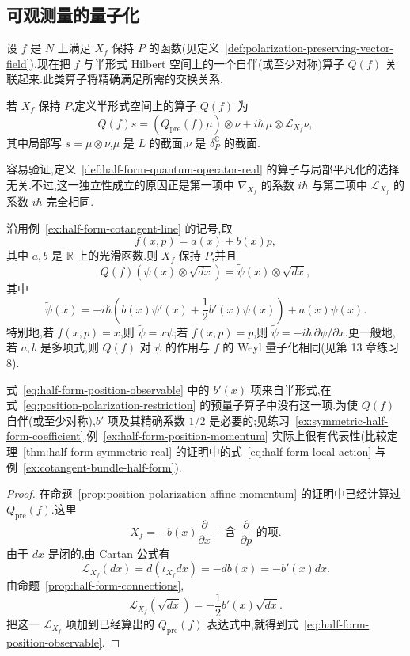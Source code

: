 \subsection{可观测量的量子化}
\label{subsec:quantization-real-observables}

设 $f$ 是 $N$ 上满足 $X_f$ 保持 $P$ 的函数(见定义~\ref{def:polarization-preserving-vector-field}).现在把 $f$ 与半形式 Hilbert 空间上的一个自伴(或至少对称)算子 $Q(f)$ 关联起来.此类算子将精确满足所需的交换关系.

\begin{definition}
\label{def:half-form-quantum-operator-real}
若 $X_f$ 保持 $P$,定义半形式空间上的算子 $Q(f)$ 为
\[
 Q(f)s=(Q_{\mathrm{pre}}(f)\mu)\otimes\nu
 +i\hbar\,\mu\otimes\mathcal L_{X_f}\nu,
 \label{eq:half-form-quantum-operator-real}
\]
其中局部写 $s=\mu\otimes\nu$,$\mu$ 是 $L$ 的截面,$\nu$ 是 $\delta_P^{\mathbb C}$ 的截面.
\end{definition}

容易验证,定义~\ref{def:half-form-quantum-operator-real} 的算子与局部平凡化的选择无关.不过,这一独立性成立的原因正是第一项中 $\nabla_{X_f}$ 的系数 $i\hbar$ 与第二项中 $\mathcal L_{X_f}$ 的系数 $i\hbar$ 完全相同.

\begin{example}[半形式修正的位置动量算子]
\label{ex:half-form-position-momentum}
沿用例~\ref{ex:half-form-cotangent-line} 的记号,取
\[
 f(x,p)=a(x)+b(x)p,
\]
其中 $a,b$ 是 $\mathbb R$ 上的光滑函数.则 $X_f$ 保持 $P$,并且
\[
 Q(f)\left(\psi(x)\otimes\sqrt{dx}\right)
 =\widetilde\psi(x)\otimes\sqrt{dx},
\]
其中
\[
 \widetilde\psi(x)=-i\hbar\left(b(x)\psi'(x)+\frac12b'(x)\psi(x)\right)+a(x)\psi(x).
 \label{eq:half-form-position-observable}
\]
特别地,若 $f(x,p)=x$,则 $\widetilde\psi=x\psi$;若 $f(x,p)=p$,则 $\widetilde\psi=-i\hbar\,\partial\psi/\partial x$.更一般地,若 $a,b$ 是多项式,则 $Q(f)$ 对 $\psi$ 的作用与 $f$ 的 Weyl 量子化相同(见第 13 章练习 8).
\end{example}

式~\eqref{eq:half-form-position-observable} 中的 $b'(x)$ 项来自半形式,在式~\eqref{eq:position-polarization-restriction} 的预量子算子中没有这一项.为使 $Q(f)$ 自伴(或至少对称),$b'$ 项及其精确系数 $1/2$ 是必要的;见练习~\ref{ex:symmetric-half-form-coefficient}.例~\ref{ex:half-form-position-momentum} 实际上很有代表性(比较定理~\ref{thm:half-form-symmetric-real} 的证明中的式~\eqref{eq:half-form-local-action} 与例~\ref{ex:cotangent-bundle-half-form}).

\begin{proof}
在命题~\ref{prop:position-polarization-affine-momentum} 的证明中已经计算过 $Q_{\mathrm{pre}}(f)$.这里
\[
 X_f=-b(x)\frac{\partial}{\partial x}+\text{含 }\frac{\partial}{\partial p}\text{ 的项}.
\]
由于 $dx$ 是闭的,由 Cartan 公式有
\[
 \mathcal L_{X_f}(dx)=d(\iota_{X_f}dx)=-db(x)=-b'(x)dx.
\]
由命题~\ref{prop:half-form-connections},
\[
 \mathcal L_{X_f}(\sqrt{dx})=-\frac12b'(x)\sqrt{dx}.
\]
把这一 $\mathcal L_{X_f}$ 项加到已经算出的 $Q_{\mathrm{pre}}(f)$ 表达式中,就得到式~\eqref{eq:half-form-position-observable}.
\end{proof}

